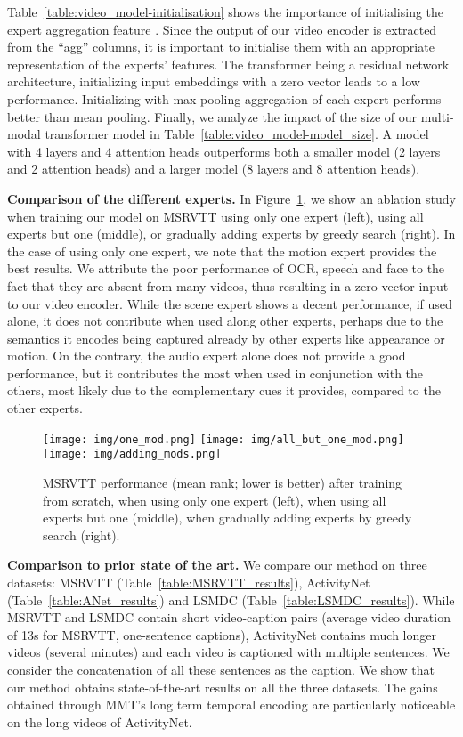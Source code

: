 \documentclass[runningheads]{llncs}
\begin{document}
Table~\ref{table:video_model-initialisation} shows the importance of initialising the expert aggregation feature . Since the output of our video encoder is extracted from the ``agg'' columns, it is important to initialise them with an appropriate representation of the experts' features. The transformer being a residual network architecture, initializing  input embeddings with a zero vector leads to a low performance. Initializing with max pooling aggregation of each expert performs better than mean pooling.
Finally, we analyze the impact of the size of our multi-modal transformer model in Table~\ref{table:video_model-model_size}. A model with 4 layers and 4 attention heads outperforms both a smaller model (2 layers and 2 attention heads) and a larger model (8 layers and 8 attention heads).

\noindent\textbf{Comparison of the different experts.} In Figure~\ref{fig:experts_ablation}, we show an ablation study when training our model on MSRVTT using only one expert (left), using all experts but one (middle), or gradually adding experts by greedy search (right). 
In the case of using only one expert, we note that the motion expert provides the best results. We attribute the poor performance of OCR, speech and face to the fact that they are absent from many videos, thus resulting in a zero vector input to our video encoder.
While the scene expert shows a decent performance, if used alone, it does not contribute when used along other experts, perhaps due to the semantics it encodes being captured already by other experts like appearance or motion. On the contrary, the audio expert alone does not provide a good performance, but it contributes the most when used in conjunction with the others, most likely due to the complementary cues it provides, compared to the other experts.

\begin{figure}[t]
    \centering
    \texttt{[image: img/one\_mod.png]}
    \texttt{[image: img/all\_but\_one\_mod.png]}
    \texttt{[image: img/adding\_mods.png]}
    \caption{MSRVTT performance (mean rank; lower is better) after training from scratch, when using only one expert (left), when using all experts but one (middle), when gradually adding experts by greedy search (right).}
    \label{fig:experts_ablation}
\end{figure}

\noindent\textbf{Comparison to prior state of the art.}
We compare our method on three  datasets: MSRVTT (Table~\ref{table:MSRVTT_results}), ActivityNet (Table~\ref{table:ANet_results}) and LSMDC (Table~\ref{table:LSMDC_results}). While MSRVTT and LSMDC contain short video-caption pairs (average video duration of 13s for MSRVTT, one-sentence captions), ActivityNet contains much longer videos (several minutes) and each video is captioned with multiple sentences. We consider the concatenation of all these sentences as the caption. We show that our method obtains state-of-the-art results on all the three datasets. The gains obtained through MMT's long term temporal encoding are particularly noticeable on the long videos of ActivityNet. 
\end{document}

